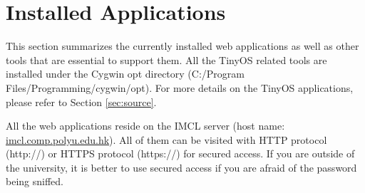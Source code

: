 \section{Installed Applications}
\label{sec:overview}
This section summarizes the currently installed web applications as well as other tools that are essential to support them. All the TinyOS related tools are installed under the Cygwin opt directory (C:/Program Files/Programming/cygwin/opt). For more details on the TinyOS applications, please refer to Section \ref{sec:source}.

All the web applications reside on the IMCL server (host name: \url{imcl.comp.polyu.edu.hk}). All of them can be visited with HTTP protocol (http://) or HTTPS protocol (https://) for secured access. If you are outside of the university, it is better to use secured access if you are afraid of the password being sniffed.
